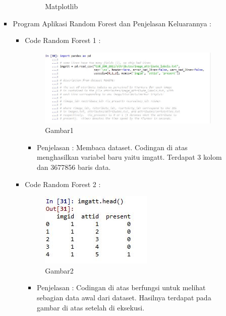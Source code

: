 \begin{enumerate}
\begin{itemize}
\begin{itemize}
\begin{itemize}
\begin{figure}[ht]
\caption{Matplotlib}
\label{contoh}
\end{figure}
\par
\end{itemize}

\par
\par
\item Program Aplikasi Random Forest dan Penjelasan Keluarannya :
\begin{itemize}
\item Code Random Forest 1 :
\par
\begin{figure}[ht]
\centering
\includegraphics[scale=0.7]{figures/cod1.jpg}
\caption{Gambar1}
\label{contoh}
\end{figure}
\par
\begin{itemize}
\item Penjelasan : Membaca dataset. Codingan di atas menghasilkan variabel baru yaitu imgatt. Terdapat 3 kolom dan 3677856 baris data.
\par 
\par
\end{itemize}
\item Code Random Forest 2 :
\par
\begin{figure}[ht]
\centering
\includegraphics[scale=0.7]{figures/cod2.jpg}
\caption{Gambar2}
\label{contoh}
\end{figure}
\par
\begin{itemize}
\item Penjelasan : Codingan di atas berfungsi untuk melihat sebagian data awal dari dataset. Hasilnya terdapat pada gambar di atas setelah di eksekusi.

\end{itemize}
\end{itemize}
\end{itemize}
\end{itemize}
\end{enumerate}
